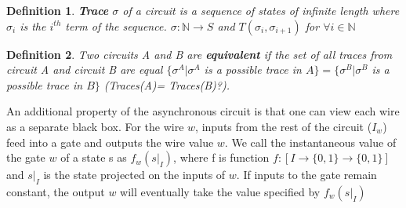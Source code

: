 \documentclass{article}
\newtheorem*{definition}{Definition}
\begin{document}
\begin{definition} \textbf{Trace} $\sigma$ of a circuit is a sequence of states of infinite length where $\sigma_i$ is the $i^{th}$ term of the sequence.  $\sigma: \mathbb{N} \to S$ and $T(\sigma_i,\sigma_{i+1})$ for $\forall i \in \mathbb{N}$\end{definition} 

\begin{definition} Two circuits A and B are \textbf{equivalent} if the set of all traces from circuit A and circuit B are equal $\{\sigma^A |\sigma^A$ is a possible trace in $A\}=\{\sigma^B |\sigma^B$ is a possible trace in $B\}$ (Traces(A)= Traces(B)?).
\end{definition}

An additional property of the asynchronous circuit is that one can view each wire as a separate black box.  For the wire $w$, inputs from the rest of the circuit ($I_w$) feed into a gate and outputs the wire value $w$.  We call the instantaneous value of the gate $w$ of a state s as $f_w(s|_I)$, where f is function $f:[I \to \{0,1\} \to \{0,1\}]$ and $s|_I$ is the state projected on the inputs of $w$.  If inputs to the gate remain constant, the output $w$ will eventually take the value specified by $f_w(s|_I)$  %
\newline
\end{document}
